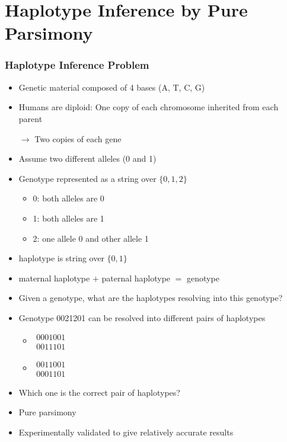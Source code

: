 \documentclass[handout]{beamer}
\begin{document}
\section{Haplotype Inference by Pure Parsimony}
\begin{frame}
\frametitle{Haplotype Inference Problem}
\begin{itemize}
\item Genetic material composed of 4 bases (A, T, C, G)
\item Humans are diploid: One copy of each chromosome inherited from each parent
\item[$\rightarrow$] Two copies of each gene
\item Assume two different alleles (0 and 1)
\item Genotype represented as a string over $\{0,1,2\}$
\begin{itemize}
\item 0: both alleles are 0
\item 1: both alleles are 1
\item 2: one allele 0 and other allele 1
\end{itemize}
\item haplotype is string over $\{0,1\}$
\item maternal haplotype $+$ paternal haplotype $=$ genotype
\end{itemize}
\end{frame}

\begin{frame}
\begin{itemize}
\item Given a genotype, what are the haplotypes resolving into this genotype?
\item Genotype 0021201 can be resolved into different pairs of haplotypes
\begin{itemize}
\item $\begin{matrix}
0001001  \\\hline
0011101 
\end{matrix}$
\item $\begin{matrix}
0011001 \\\hline
0001101 
\end{matrix}$
\end{itemize}
\item Which one is the correct pair of haplotypes?
\item Pure parsimony
\item Experimentally validated to give relatively accurate results
\end{itemize}
\end{frame}
\end{document}
